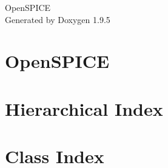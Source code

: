 \documentclass[twoside]{book}
\newcommand{\+}{\discretionary{\mbox{\scriptsize$\hookleftarrow$}}{}{}}
\newcommand{\clearemptydoublepage}{%
    \newpage{\pagestyle{empty}\cleardoublepage}%
  }
\begin{document}
  \raggedbottom
    \hypersetup{pageanchor=false,
                bookmarksnumbered=true,
                pdfencoding=unicode
               }
  \begin{titlepage}
  \vspace*{7cm}
  \begin{center}%
  {\Large Open\+SPICE}\\
  \vspace*{1cm}
  {\large Generated by Doxygen 1.9.5}\\
  \end{center}
  \end{titlepage}
  \clearemptydoublepage
  \tableofcontents
  \clearemptydoublepage
  \hypersetup{pageanchor=true}
\chapter{Open\+SPICE}
\label{index}\hypertarget{index}{}
\chapter{Hierarchical Index}

\chapter{Class Index}

\end{document}
